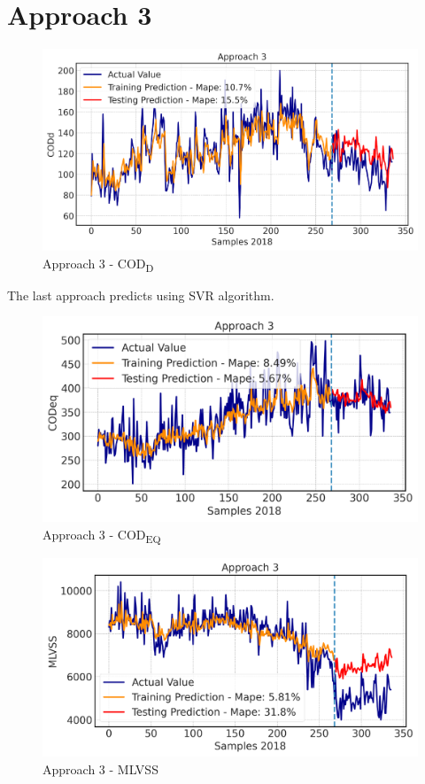 \section{Approach 3}

\begin{figure}[h!]
\centering
\includegraphics[width=\linewidth]{figures/Ch5/CODd-3.pdf}
\caption{Approach 3 - COD\textsubscript{D}}
\label{f:App3-codd}
\end{figure}

The last approach predicts using \ac{SVR} algorithm.

\begin{figure}[h!]
\centering
\includegraphics[width=\linewidth]{figures/Ch5/CODeq-3.pdf}
\caption{Approach 3 - COD\textsubscript{EQ}}
\label{f:App3-codeq}
\end{figure}

\begin{figure}[h!]
\centering
\includegraphics[width=\linewidth]{figures/Ch5/MLVSS-approach3.pdf}
\caption{Approach 3 - MLVSS}
\label{f:App3-MLVSS}
\end{figure}

